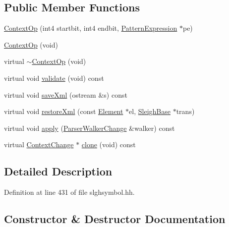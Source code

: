 \subsection*{Public Member Functions}
\begin{DoxyCompactItemize}
\item 
\mbox{\hyperlink{class_context_op_af05ac034c9f964e04dec29b4eb73cb95}{Context\+Op}} (int4 startbit, int4 endbit, \mbox{\hyperlink{class_pattern_expression}{Pattern\+Expression}} $\ast$pe)
\item 
\mbox{\hyperlink{class_context_op_a67722af7a45f6c17e1a67b671d2c75b7}{Context\+Op}} (void)
\item 
virtual \mbox{\hyperlink{class_context_op_a858cd3ce5a361498e72e77149fc110e5}{$\sim$\+Context\+Op}} (void)
\item 
virtual void \mbox{\hyperlink{class_context_op_af3861ab0ca59793e1ed5d361fce4eb34}{validate}} (void) const
\item 
virtual void \mbox{\hyperlink{class_context_op_ab0ddc8b720a9958f4dff5dae7f6cd288}{save\+Xml}} (ostream \&s) const
\item 
virtual void \mbox{\hyperlink{class_context_op_ad116f3dd9045a92b84ae10eefaf74f04}{restore\+Xml}} (const \mbox{\hyperlink{class_element}{Element}} $\ast$el, \mbox{\hyperlink{class_sleigh_base}{Sleigh\+Base}} $\ast$trans)
\item 
virtual void \mbox{\hyperlink{class_context_op_aaaa3a32d48b60c9b3eef69a00b9cba2c}{apply}} (\mbox{\hyperlink{class_parser_walker_change}{Parser\+Walker\+Change}} \&walker) const
\item 
virtual \mbox{\hyperlink{class_context_change}{Context\+Change}} $\ast$ \mbox{\hyperlink{class_context_op_a157a525c2c9db4f2cd01cb0dc579963e}{clone}} (void) const
\end{DoxyCompactItemize}


\subsection{Detailed Description}


Definition at line 431 of file slghsymbol.\+hh.



\subsection{Constructor \& Destructor Documentation}
\mbox{\label{class_context_op_af05ac034c9f964e04dec29b4eb73cb95}} 
